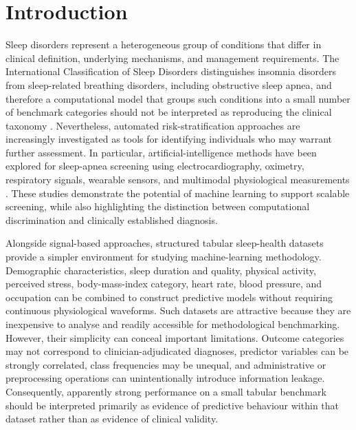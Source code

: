 \documentclass[a4paper,fleqn]{cas-dc}
\begin{document}
\maketitle

\section{Introduction}

Sleep disorders represent a heterogeneous group of conditions that differ in clinical definition, underlying mechanisms, and management requirements. The International Classification of Sleep Disorders distinguishes insomnia disorders from sleep-related breathing disorders, including obstructive sleep apnea, and therefore a computational model that groups such conditions into a small number of benchmark categories should not be interpreted as reproducing the clinical taxonomy \cite{aasm2023}. Nevertheless, automated risk-stratification approaches are increasingly investigated as tools for identifying individuals who may warrant further assessment. In particular, artificial-intelligence methods have been explored for sleep-apnea screening using electrocardiography, oximetry, respiratory signals, wearable sensors, and multimodal physiological measurements \cite{bazoukis2023,tyagi2023,abdalrazaq2024,giorgi2025}. These studies demonstrate the potential of machine learning to support scalable screening, while also highlighting the distinction between computational discrimination and clinically established diagnosis.

Alongside signal-based approaches, structured tabular sleep-health datasets provide a simpler environment for studying machine-learning methodology. Demographic characteristics, sleep duration and quality, physical activity, perceived stress, body-mass-index category, heart rate, blood pressure, and occupation can be combined to construct predictive models without requiring continuous physiological waveforms. Such datasets are attractive because they are inexpensive to analyse and readily accessible for methodological benchmarking. However, their simplicity can conceal important limitations. Outcome categories may not correspond to clinician-adjudicated diagnoses, predictor variables can be strongly correlated, class frequencies may be unequal, and administrative or preprocessing operations can unintentionally introduce information leakage. Consequently, apparently strong performance on a small tabular benchmark should be interpreted primarily as evidence of predictive behaviour within that dataset rather than as evidence of clinical validity.
\end{document}
